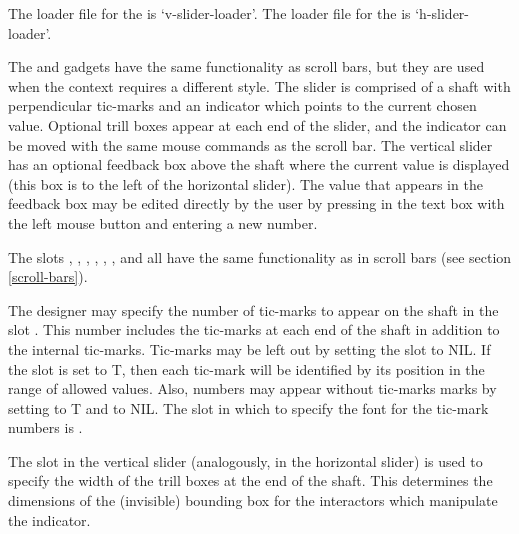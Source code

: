 \begin{center}
\end{center}

\begin{group} The loader file for the  is `v-slider-loader'.
The loader file for the  is `h-slider-loader'.
\end{group}
\vspace{1 line}

The  and  gadgets have the same
functionality as scroll bars, but they are used when the context
requires a different style.  The slider is comprised of a shaft with
perpendicular tic-marks and an indicator which points to the current
chosen value.  Optional trill boxes appear at each end of the slider,
and the indicator can be moved with the same mouse commands as the
scroll bar.  The vertical slider has an optional feedback box above
the shaft where the current value is displayed (this box is to the
left of the horizontal slider).  The value that appears in the
feedback box may be edited directly by the user by pressing in the
text box with the left mouse button and entering a new
number.

The slots , , , ,
, , and  all have
the same functionality as in scroll bars (see section \ref{scroll-bars}).

The designer may specify the number of tic-marks to appear on the
shaft in the slot .  This number includes the tic-marks
at each end of the shaft in addition to the internal tic-marks.
Tic-marks may be left out by setting the  slot to
NIL.  If the slot  is set to T, then each tic-mark
will be identified by its position in the range of allowed values.
Also, numbers may appear without tic-marks marks by setting
 to T and  to NIL.  The slot in
which to specify the font for the tic-mark numbers is .

The slot  in the vertical slider (analogously,
 in the horizontal slider) is used to specify the
width of the trill boxes at the end of the shaft.  This determines the
dimensions of the (invisible) bounding box for the interactors which
manipulate the indicator.

